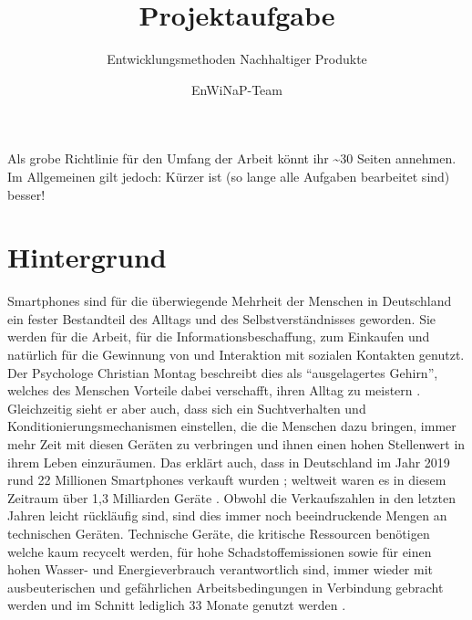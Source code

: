 \documentclass[DIV=15,headinclude=true]{scrartcl}
\begin{document}
\title{Projektaufgabe}
\subtitle{Entwicklungsmethoden Nachhaltiger Produkte}
\author{EnWiNaP-Team}
\maketitle

\tableofcontents


\begin{framed}

	Als grobe Richtlinie für den Umfang der Arbeit könnt ihr
	\textasciitilde30 Seiten annehmen. Im Allgemeinen gilt jedoch: Kürzer
	ist (so lange alle Aufgaben bearbeitet sind) besser!

\end{framed}

\section{Hintergrund}

Smartphones sind für die überwiegende Mehrheit der Menschen in
Deutschland ein fester Bestandteil des Alltags und des
Selbstverständnisses geworden. Sie werden für die Arbeit, für die
Informationsbeschaffung, zum Einkaufen und natürlich für die Gewinnung
von und Interaktion mit sozialen Kontakten genutzt. Der Psychologe
Christian Montag beschreibt dies als ``ausgelagertes Gehirn'', welches
des Menschen Vorteile dabei verschafft, ihren Alltag zu meistern
\cite{Spanke2019}. Gleichzeitig sieht er aber auch, dass sich ein
Suchtverhalten und Konditionierungsmechanismen einstellen, die die
Menschen dazu bringen, immer mehr Zeit mit diesen Geräten zu verbringen
und ihnen einen hohen Stellenwert in ihrem Leben einzuräumen. Das
erklärt auch, dass in Deutschland im Jahr 2019 rund 22 Millionen
Smartphones verkauft wurden \cite{Tenzer2020}; weltweit waren es in
diesem Zeitraum über 1,3 Milliarden Geräte \cite{Tenzer2020a}. Obwohl
die Verkaufszahlen in den letzten Jahren leicht rückläufig sind, sind
dies immer noch beeindruckende Mengen an technischen Geräten. Technische
Geräte, die kritische Ressourcen benötigen welche kaum recycelt werden,
für hohe Schadstoffemissionen sowie für einen hohen Wasser- und
Energieverbrauch verantwortlich sind, immer wieder mit ausbeuterischen
und gefährlichen Arbeitsbedingungen in Verbindung gebracht werden und im
Schnitt lediglich 33 Monate genutzt werden \cite{Jardim2017, Odea2020}.
\end{document}
